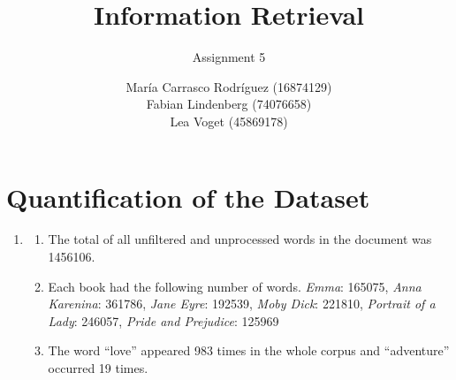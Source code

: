 \documentclass[a4paper,11pt,oneside]{book}
\title{Information Retrieval }
\subtitle{Assignment 5}
\author{ María Carrasco Rodríguez (16874129) \\
		Fabian Lindenberg (74076658)\\
		Lea Voget (45869178)}
\begin{document}
\kostspieligmaketitle


\setcounter{chapter}{1}
\chapter{Quantification of the Dataset}

\begin{enumerate}
	\item \begin{enumerate}
					\item The total of all unfiltered and unprocessed words in the document was 1456106.
					\item Each book had the following number of words. \emph{Emma}: 165075, \emph{Anna Karenina}: 361786, \emph{Jane Eyre}: 192539, \emph{Moby Dick}: 221810,  \emph{Portrait of a Lady}: 246057, \emph{Pride and Prejudice}: 125969 %
					\item The word ``love'' appeared 983 times in the whole corpus and ``adventure'' occurred 19 times. 
								

\end{enumerate}
\end{enumerate}
\end{document}
